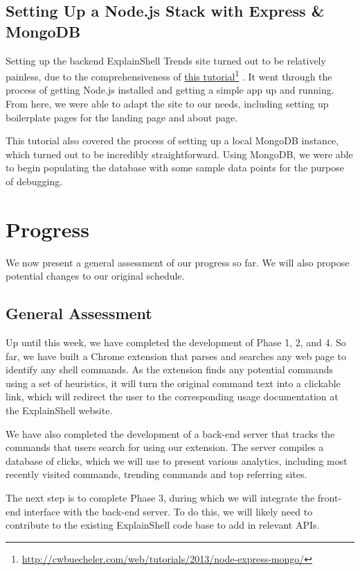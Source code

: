 \documentclass[11pt]{article}
\newcommand\fnurl[2]{%
\href{#1}{#2}\footnote{\url{#1}}%
}
\begin{document}
\subsection{Setting Up a Node.js Stack with Express \& MongoDB}

Setting up the backend ExplainShell Trends site turned out to be relatively
painless, due to the comprehensiveness of
\fnurl{http://cwbuecheler.com/web/tutorials/2013/node-express-mongo/}{this
tutorial}. It went through the process of getting Node.js installed and getting
a simple app up and running. From here, we were able to adapt the site to our
needs, including setting up boilerplate pages for the landing page and about
page.

This tutorial also covered the process of setting up a local MongoDB instance,
which turned out to be incredibly straightforward. Using MongoDB, we were able
to begin populating the database with some sample data points for the purpose of
debugging.

\section{Progress}

We now present a general assessment of our progress so far. We will
also propose potential changes to our original schedule.

\subsection{General Assessment}
Up until this week, we have completed the development of Phase 1, 2, and 4.
So far, we have built a Chrome extension that parses and searches any web page
to identify any shell commands. As the extension finds any potential
commands using a set of heuristics, it will turn the original command text 
into a clickable link, which will redirect the user to the corresponding
usage documentation at the ExplainShell website.

We have also completed the development of a back-end server that tracks
the commands that users search for using our extension. The server compiles
a database of clicks, which we will use to present various analytics, 
including most recently visited commands, trending commands and top referring
sites.

The next step is to complete Phase 3, during which we will integrate the 
front-end interface with the back-end server. To do this, we will likely need
to contribute to the existing ExplainShell code base to add in relevant APIs.
\end{document}
